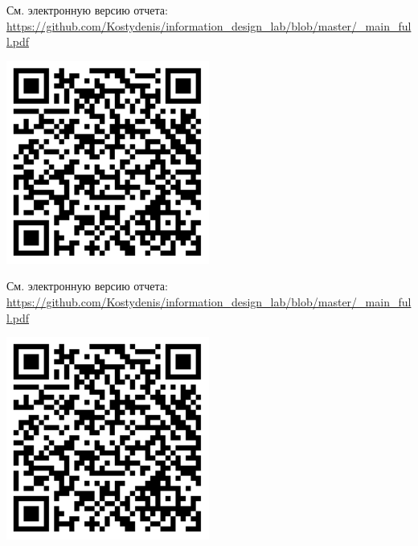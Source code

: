 \setcounter{section}{0}

См. электронную версию отчета: \url{https://github.com/Kostydenis/information_design_lab/blob/master/_main_full.pdf}
\label{lst:istu_report}
\label{lst:customCodes}
\begin{center}
	\includegraphics[width=0.5\textwidth]{pics/qr.png}
\end{center}




См. электронную версию отчета: \url{https://github.com/Kostydenis/information_design_lab/blob/master/_main_full.pdf}
\label{lst:lab1}
\begin{center}
	\includegraphics[width=0.5\textwidth]{pics/qr.png}
\end{center}
